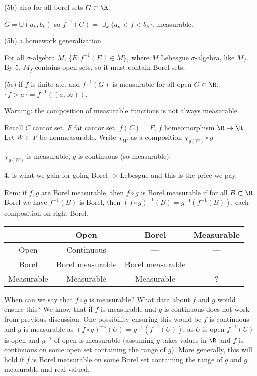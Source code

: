 (5b) also for all borel sets $G \subset \R$.

\pf $G= \cup (a_k,b_k)$ so $f^{-1}(G)= \cup_k \{a_k<f<b_k\}$, measurable.

\pf (5b) a homework generalization. 

For all $\sigma$-algebra $M$, $\{E \colon f^{-1}(E) \in M\}$, where $M$ Lebesgue $\sigma$-algebra, like $M_f$. By 5, $M_f$ contains open sets, so it must contain Borel sets.

(5c) if $f$ is finite a.e. and $f^{-1}(G)$ is measurable for all open $G \subset \R$, $\{f>a\}= f^{-1}((a,\infty))$.


Warning: the composition of measurable functions is not always measurable. 


Recall $C$ cantor set, $F$ fat cantor set, $f(C)=F$, $f$ homeomorphism $\R \to \R$. Let $W \subset F$ be nonmeasurable. Write $\chi_W$ as a composition $\chi_{g(W)} \circ g$


$\chi_{g(W)}$ is measurable, $g$ is continuous (so measurable).

4. is what we gain for going Borel -> Lebesgue and this is the price we pay.

Rem: if $f,g$ are Borel measurable, then $f \circ g$ is Borel measurable if for all $B \subset \R$ Borel we have $f^{-1}(B)$ is Borel, then $(f \circ g)^{-1}(B)= g^{-1}(f^{-1}(B))$, each composition on right Borel. 







	\begin{table}[h]
	\centering 
	\begin{tabular}{|c|c|c|c|} \hline
	\diagbox{is}{(*)} & Open & Borel & Measurable \\ \hline
	Open & Continuous & --- & --- \\ \hline
	Borel & Borel measurable & Borel measurable & --- \\ \hline
	Measurable & Measurable & Measurable & ? \\ \hline
	\end{tabular}
	\end{table}



When can we say that $f \circ g$ is measurable? What data about $f$ and $g$ would ensure this? 
We know that if $f$ is measurable and $g$ is continuous does not work from previous discussion. One possibility ensuring this would be $f$ is continuous and $g$ is measurable as $(f \circ g)^{-1}(U)= g^{-1}(f^{-1}(U))$, as $U$ is open $f^{-1}(U)$ is open and $g^{-1}$ of open is measurable (assuming $g$ takes values in $\R$ and $f$ is continuous on some open set containing the range of $g$). More generally, this will hold if $f$ is Borel measurable on some Borel set containing the range of $g$ and $g$ measurable and real-valued. 


